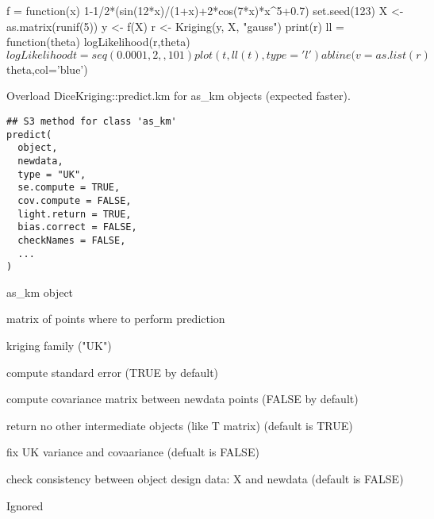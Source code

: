 \documentclass[letterpaper]{book}
\begin{document}
%
\begin{Examples}
\begin{ExampleCode}
f = function(x) 1-1/2*(sin(12*x)/(1+x)+2*cos(7*x)*x^5+0.7)
set.seed(123)
X <- as.matrix(runif(5))
y <- f(X)
r <- Kriging(y, X, "gauss")
print(r)
ll = function(theta) logLikelihood(r,theta)$logLikelihood
t = seq(0.0001,2,,101)
  plot(t,ll(t),type='l')
  abline(v=as.list(r)$theta,col='blue')
\end{ExampleCode}
\end{Examples}
%
\begin{Description}\relax
Overload DiceKriging::predict.km for as\_km objects (expected faster).
\end{Description}
%
\begin{Usage}
\begin{verbatim}
## S3 method for class 'as_km'
predict(
  object,
  newdata,
  type = "UK",
  se.compute = TRUE,
  cov.compute = FALSE,
  light.return = TRUE,
  bias.correct = FALSE,
  checkNames = FALSE,
  ...
)
\end{verbatim}
\end{Usage}
%
\begin{Arguments}
\begin{ldescription}
\item[\code{object}] as\_km object

\item[\code{newdata}] matrix of points where to perform prediction

\item[\code{type}] kriging family ("UK")

\item[\code{se.compute}] compute standard error (TRUE by default)

\item[\code{cov.compute}] compute covariance matrix between newdata points (FALSE by default)

\item[\code{light.return}] return no other intermediate objects (like T matrix) (default is TRUE)

\item[\code{bias.correct}] fix UK variance and covaariance (defualt is FALSE)

\item[\code{checkNames}] check consistency between object design data: X and newdata (default is FALSE)

\item[\code{...}] Ignored
\end{ldescription}
\end{Arguments}
\end{document}
